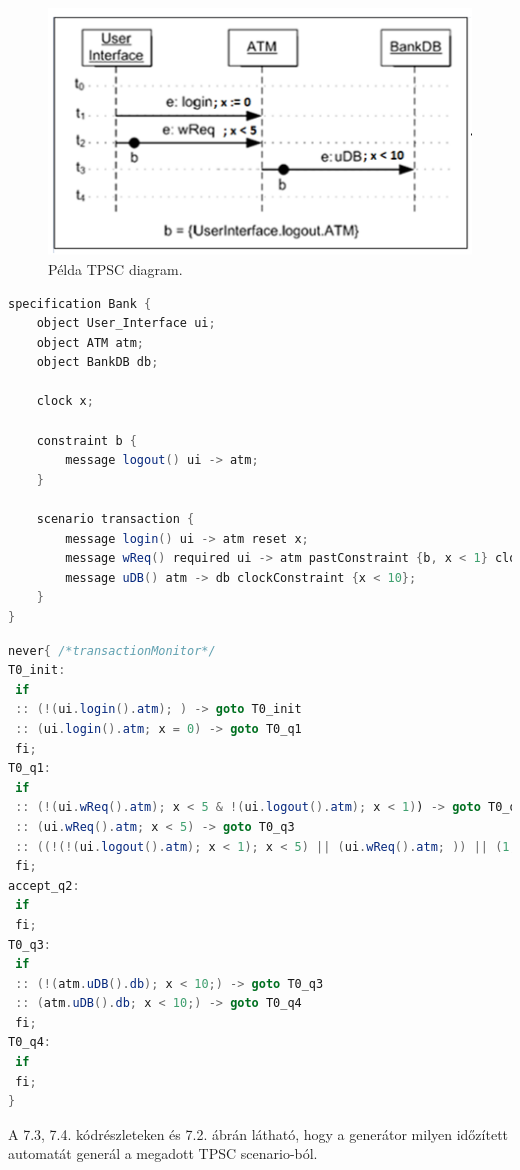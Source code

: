 \begin{figure}[h!]
    \centering
    \includegraphics[width=130mm, keepaspectratio]{figures/14abra.png}
    \caption{Példa TPSC diagram.}
\end{figure}

\begin{lstlisting}[language=java,frame=single, float=h!, caption={TPSC scenario szöveges leírása.},captionpos=b]
specification Bank {
	object User_Interface ui;
	object ATM atm;
	object BankDB db;

	clock x;

	constraint b {
		message logout() ui -> atm;
	}

	scenario transaction {
		message login() ui -> atm reset x;
		message wReq() required ui -> atm pastConstraint {b, x < 1} clockConstraint {x < 5};
		message uDB() atm -> db clockConstraint {x < 10};
	}
}
\end{lstlisting}

\begin{lstlisting}[language=java,frame=single, float=h!, caption={Generált időzített automata never claim formátumban.},captionpos=b]
never{ /*transactionMonitor*/
T0_init:
 if
 :: (!(ui.login().atm); ) -> goto T0_init
 :: (ui.login().atm; x = 0) -> goto T0_q1
 fi;
T0_q1:
 if
 :: (!(ui.wReq().atm); x < 5 & !(ui.logout().atm); x < 1)) -> goto T0_q1
 :: (ui.wReq().atm; x < 5) -> goto T0_q3
 :: ((!(!(ui.logout().atm); x < 1); x < 5) || (ui.wReq().atm; )) || (1, x >= 5))) -> goto accept_q2
 fi;
accept_q2:
 if
 fi;
T0_q3:
 if
 :: (!(atm.uDB().db); x < 10;) -> goto T0_q3
 :: (atm.uDB().db; x < 10;) -> goto T0_q4
 fi;
T0_q4:
 if
 fi;
}
\end{lstlisting}

A 7.3, 7.4. kódrészleteken és 7.2. ábrán látható, hogy a generátor milyen időzített automatát generál a megadott TPSC scenario-ból.